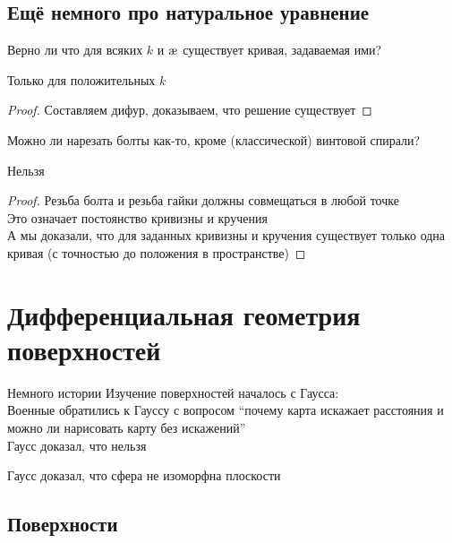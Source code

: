 \section{Ещё немного про натуральное уравнение}

\begin{quest}
	Верно ли что для всяких $ k $ и $ \text\ae $ существует кривая, задаваемая ими?
\end{quest}

\begin{answer}
	Только для положительных $ k $
\end{answer}

\begin{proof}
	Составляем дифур, доказываем, что решение существует
\end{proof}

\begin{quest}
	Можно ли нарезать болты как-то, кроме (классической) винтовой спирали?
\end{quest}

\begin{answer}
	Нельзя
\end{answer}

\begin{proof}
	Резьба болта и резьба гайки должны совмещаться в любой точке \\
	Это означает постоянство кривизны и кручения \\
	А мы доказали, что для заданных кривизны и кручения существует только одна кривая (с точностью до положения в пространстве)
\end{proof}

\chapter{Дифференциальная геометрия поверхностей}

\begin{undefthm}{Немного истории}
	Изучение поверхностей началось с Гаусса: \\
	Военные обратились к Гауссу с вопросом ``почему карта искажает расстояния и можно ли нарисовать карту без искажений'' \\
	Гаусс доказал, что нельзя
\end{undefthm}

\begin{note}
	Гаусс доказал, что сфера не изоморфна плоскости
\end{note}

\section{Поверхности}

